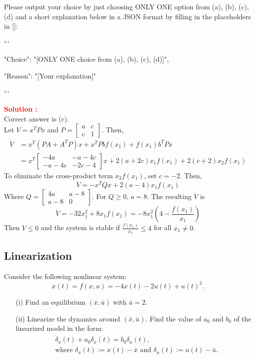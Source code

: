 \documentclass[12pt]{article}
\begin{document}
Please output your choice by just choosing ONLY ONE option from (a), (b), (c), (d) and a short explanation below in a JSON format by filling in the placeholders in []:

```
{

"Choice": "[ONLY ONE choice from (a), (b), (c), (d)]",

"Reason": "[Your explanation]"

}

```

\textbf{\textcolor{red}{Solution :}} \\
Correct answer is (c).\\
Let \(V = x^T P x\) and \(P = \begin{bmatrix} a & c \\ c & 1 \end{bmatrix}\). Then,
\begin{align}
    \dot{V} &= x^T(PA + A^T P)x + x^T P b f(x_1) + f(x_1) b^T P x \\
    & = x^T \begin{bmatrix}
        -4a & -a-4c \\ -a-4c & -2c-4
    \end{bmatrix}x + 2(a+2c)x_1f(x_1) + 2(c+2)x_2f(x_1)
\end{align}  
To eliminate the cross-product term \(x_2 f(x_1)\), set \(c = -2\). Then,
\[ \dot{V} = -x^T Q x + 2(a-4)x_1 f(x_1) \]
Where \(Q = \begin{bmatrix}
    4a & a-8 \\ a-8 & 0
\end{bmatrix}\). For \(Q \geq 0\), \(a = 8\). The resulting \(\dot{V}\) is
\begin{equation}
    \dot{V} = -32 x_1^2 + 8x_1f(x_1) = -8x_1^2\left(4 - \frac{f(x_1)}{x_1}\right)
\end{equation}
Then \(\dot{V} \leq 0\) and the system is stable if \(\frac{f(x_1)}{x_1} \leq 4\) for all \(x_1 \neq 0\).
\clearpage

\subsection{Linearization}

Consider the following nonlinear system:
$$\dot{x}(t) = f(x,u) =  -4x(t) - 2u(t) + u(t)^3.$$
\begin{itemize}
    \item[(i)] Find an equilibrium $(\bar{x},\bar{u})$ with $\bar{u} = 2.$
    \item[(ii)] Linearize the dynamics around $(\bar{x},\bar{u})$. Find the value of $a_0$ and $b_0$ of the linearized model in the form:
    \begin{align*}
        &\dot{\delta}_x(t) + a_0 \delta_x(t) = b_0 \delta_u(t), \\
        &\text{where}\,\, \delta_x(t) := x(t) - \bar{x} \,\, \text{and} \,\, \delta_u(t) := u(t) - \bar{u}.
    \end{align*}
        \end{itemize}
\end{document}
